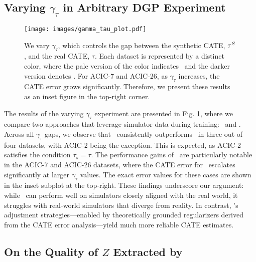 \subsection{Varying $\gamma_\tau$ in Arbitrary DGP Experiment}
\label{sec:large_gamma_tau}
\begin{figure}
    \centering
    \texttt{[image: images/gamma\_tau\_plot.pdf]}
    \caption{\small{We vary $\gamma_\tau$, which controls the gap between the synthetic CATE, $\tau^S$, and the real CATE, $\tau$. Each dataset is represented by a distinct color, where the pale version of the color indicates \simonly\ and the darker version denotes \our. For ACIC-7 and ACIC-26, as $\gamma_\tau$ increases, the CATE error grows significantly. Therefore, we present these results as an inset figure in the top-right corner.}}
    \label{fig:gamma_tau}
\end{figure}
The results of the varying $\gamma_\tau$ experiment are presented in Fig. \ref{fig:gamma_tau}, where we compare two approaches that leverage simulator data during training: \simonly\ and \our. Across all $\gamma_\tau$ gaps, we observe that \our\ consistently outperforms \simonly\ in three out of four datasets, with ACIC-2 being the exception. This is expected, as ACIC-2 satisfies the condition $\tau_s = \tau$. The performance gains of \our\ are particularly notable in the ACIC-7 and ACIC-26 datasets, where the CATE error for \simonly\ escalates significantly at larger $\gamma_\tau$ values. The exact error values for these cases are shown in the inset subplot at the top-right. These findings underscore our argument: while \simonly\ can perform well on simulators closely aligned with the real world, it struggles with real-world simulators that diverge from reality. In contrast, \our's adjustment strategies—enabled by theoretically grounded regularizers derived from the CATE error analysis—yield much more reliable CATE estimates.



\subsection{On the Quality of $Z$ Extracted by \our}

